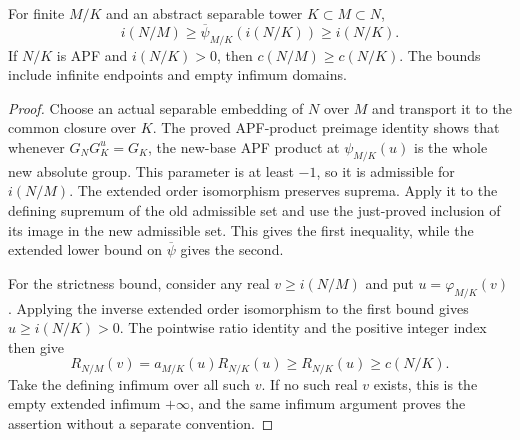 \begin{proposition}
\label{fw:apf-finite-base-bounds}
\leanok
For finite $M/K$ and an abstract separable tower $K\subset M\subset N$,
\[
 i(N/M)\geq\overline\psi_{M/K}(i(N/K))\geq i(N/K).
\]
If $N/K$ is APF and $i(N/K)>0$, then $c(N/M)\geq c(N/K)$.
The bounds include infinite endpoints and empty infimum domains.
\end{proposition}
\begin{proof}
Choose an actual separable embedding of $N$ over $M$ and transport it
to the common closure over $K$. The proved APF-product preimage
identity shows that whenever $G_NG_K^u=G_K$, the new-base APF product
at $\psi_{M/K}(u)$ is the whole new absolute group. This parameter is
at least $-1$, so it is admissible for $i(N/M)$. The extended order
isomorphism preserves suprema. Apply it to the defining supremum of
the old admissible set and use the just-proved inclusion of its image
in the new admissible set. This gives the first inequality, while the
extended lower bound on $\overline\psi$ gives the second.

For the strictness bound, consider any real $v\geq i(N/M)$ and put
$u=\varphi_{M/K}(v)$. Applying the inverse extended order isomorphism
to the first bound gives $u\geq i(N/K)>0$. The pointwise ratio identity
and the positive integer index then give
\[
 R_{N/M}(v)=a_{M/K}(u)R_{N/K}(u)
            \geq R_{N/K}(u)\geq c(N/K).
\]
Take the defining infimum over all such $v$. If no such real $v$
exists, this is the empty extended infimum $+\infty$, and the same
infimum argument proves the assertion without a separate convention.
\end{proof}

